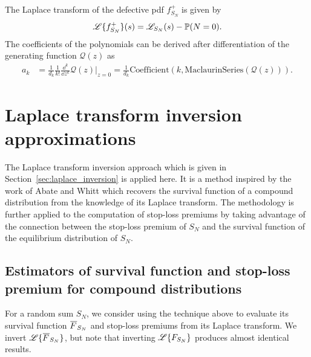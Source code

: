 The Laplace transform of the defective pdf $f_{S_N}^{+}$ is given by
$$
\mathscr{L}\{f_{S_N}^{+}\}(s)=\mathscr{L}_{S_N}(s)-\operatorname{{\mathbb P}}(N=0).
$$
The coefficients of the polynomials can be derived after differentiation of the generating function $\mathcal{Q}(z)$ as
\begin{align*}\label{eq:PolynomialExpansionCoefficientDerivativeGeneratingFunction}
a_k&=\frac{1}{d_k}\frac{1}{k!}\frac{\dd^{k}}{\dd z^{k}}\mathcal{Q}(z)\Big\rvert_{z=0}  =\frac{1}{d_k} \text{Coefficient}(k, \text{MaclaurinSeries}(\mathcal{Q}(z))).
\end{align*}

\section{Laplace transform inversion approximations}\label{sec:NumericalInversionLaplaceTransform}

The Laplace transform inversion approach which is given in Section~\ref{sec:laplace_inversion} is applied here.
It is a method inspired by the work of Abate and Whitt \cite{Abate1992} which recovers the survival function of a compound distribution from the knowledge of its Laplace transform. The methodology is further applied to the computation of stop-loss premiums by taking advantage of the connection between the stop-loss premium of $S_N$ and the survival function of the equilibrium distribution of $S_N$.

\subsection{Estimators of survival function and stop-loss premium for compound distributions}

For a random sum $S_N$, we consider using the technique above to evaluate its survival function $\Ftail_{S_N}$ and stop-loss premiums from its Laplace transform.
We invert $\LT{\Ftail_{S_N}}$, but note that inverting $\mathscr{L}\{F_{S_N}\}$ produces almost identical results.

